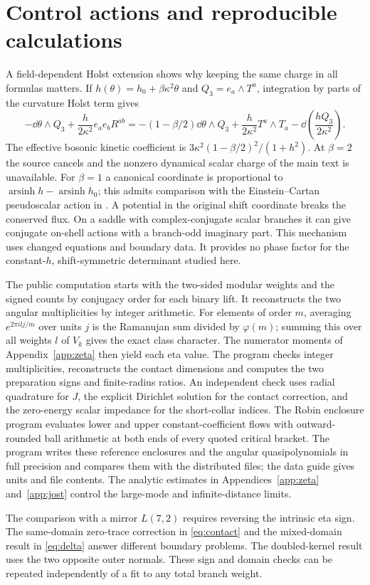 \section{Control actions and reproducible calculations}\label{app:checks}
A field-dependent Holst extension shows why keeping the same charge in all formulas matters. If $h(\theta)=h_0+\beta\kappa^2\theta$ and $Q_3=e_a\wedge T^a$, integration by parts of the curvature Holst term gives
\[
 -\dd\theta\wedge Q_3+\frac{h}{2\kappa^2}e_ae_bR^{ab}
 =-(1-\beta/2)\dd\theta\wedge Q_3+
 \frac{h}{2\kappa^2}T^a\wedge T_a-
 \dd\!\left(\frac{hQ_3}{2\kappa^2}\right).
\]
The effective bosonic kinetic coefficient is $3\kappa^2(1-\beta/2)^2/(1+h^2)$. At $\beta=2$ the source cancels and the nonzero dynamical scalar charge of the main text is unavailable. For $\beta=1$ a canonical coordinate is proportional to $\operatorname{arsinh}h-\operatorname{arsinh}h_0$; this admits comparison with the Einstein--Cartan pseudoscalar action in \cite{KSZ}. A potential in the original shift coordinate breaks the conserved flux. On a saddle with complex-conjugate scalar branches it can give conjugate on-shell actions with a branch-odd imaginary part. This mechanism uses changed equations and boundary data. It provides no phase factor for the constant-$h$, shift-symmetric determinant studied here.

The public computation starts with the two-sided modular weights and the signed counts by conjugacy order for each binary lift. It reconstructs the two angular multiplicities by integer arithmetic. For elements of order $m$, averaging $e^{2\pi i l j/m}$ over units $j$ is the Ramanujan sum divided by $\varphi(m)$; summing this over all weights $l$ of $V_k$ gives the exact class character. The numerator moments of Appendix~\ref{app:zeta} then yield each eta value. The program checks integer multiplicities, reconstructs the contact dimensions and computes the two preparation signs and finite-radius ratios. An independent check uses radial quadrature for $J$, the explicit Dirichlet solution for the contact correction, and the zero-energy scalar impedance for the short-collar indices. The Robin enclosure program evaluates lower and upper constant-coefficient flows with outward-rounded ball arithmetic at both ends of every quoted critical bracket. The program writes these reference enclosures and the angular quasipolynomials in full precision and compares them with the distributed files; the data guide gives units and file contents. The analytic estimates in Appendices~\ref{app:zeta} and~\ref{app:jost} control the large-mode and infinite-distance limits.

The comparison with a mirror $L(7,2)$ requires reversing the intrinsic eta sign. The same-domain zero-trace correction in \eqref{eq:contact} and the mixed-domain result in \eqref{eq:delta} answer different boundary problems. The doubled-kernel result uses the two opposite outer normals. These sign and domain checks can be repeated independently of a fit to any total branch weight.
